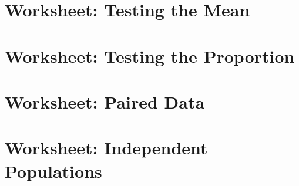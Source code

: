 \documentclass{ccg-topic}
\begin{document}
\newpage
\section{Worksheet: Testing the Mean}


\newpage
\section{Worksheet: Testing the Proportion}


\newpage
\section{Worksheet: Paired Data}


\newpage
\section{Worksheet: Independent Populations}

\end{document}
